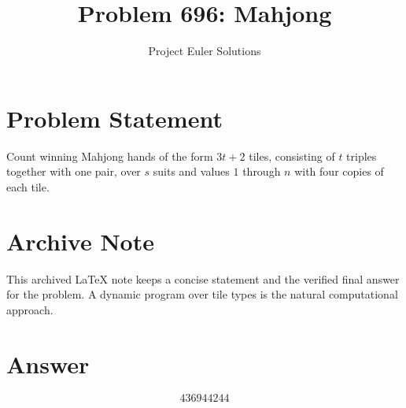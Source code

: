 \documentclass[11pt]{article}
\title{Problem 696: Mahjong}
\author{Project Euler Solutions}
\date{}
\begin{document}
\maketitle

\section{Problem Statement}
Count winning Mahjong hands of the form $3t+2$ tiles, consisting of $t$ triples together with one pair, over $s$ suits and values $1$ through $n$ with four copies of each tile.

\section{Archive Note}
This archived LaTeX note keeps a concise statement and the verified final answer for the problem. A dynamic program over tile types is the natural computational approach.

\section{Answer}

\[
\boxed{436944244}
\]
\end{document}
